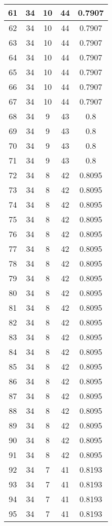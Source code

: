 \documentclass[letterpaper, 12pt]{article}
\begin{document}
\begin{longtable}{|c|c|c|c|c|}
\hline
61 & 34 & 10 & 44 & 0.7907 \\
\hline
62 & 34 & 10 & 44 & 0.7907 \\
\hline
63 & 34 & 10 & 44 & 0.7907 \\
\hline
64 & 34 & 10 & 44 & 0.7907 \\
\hline
65 & 34 & 10 & 44 & 0.7907 \\
\hline
66 & 34 & 10 & 44 & 0.7907 \\
\hline
67 & 34 & 10 & 44 & 0.7907 \\
\hline
68 & 34 & 9 & 43 & 0.8 \\
\hline
69 & 34 & 9 & 43 & 0.8 \\
\hline
70 & 34 & 9 & 43 & 0.8 \\
\hline
71 & 34 & 9 & 43 & 0.8 \\
\hline
72 & 34 & 8 & 42 & 0.8095 \\
\hline
73 & 34 & 8 & 42 & 0.8095 \\
\hline
74 & 34 & 8 & 42 & 0.8095 \\
\hline
75 & 34 & 8 & 42 & 0.8095 \\
\hline
76 & 34 & 8 & 42 & 0.8095 \\
\hline
77 & 34 & 8 & 42 & 0.8095 \\
\hline
78 & 34 & 8 & 42 & 0.8095 \\
\hline
79 & 34 & 8 & 42 & 0.8095 \\
\hline
80 & 34 & 8 & 42 & 0.8095 \\
\hline
81 & 34 & 8 & 42 & 0.8095 \\
\hline
82 & 34 & 8 & 42 & 0.8095 \\
\hline
83 & 34 & 8 & 42 & 0.8095 \\
\hline
84 & 34 & 8 & 42 & 0.8095 \\
\hline
85 & 34 & 8 & 42 & 0.8095 \\
\hline
86 & 34 & 8 & 42 & 0.8095 \\
\hline
87 & 34 & 8 & 42 & 0.8095 \\
\hline
88 & 34 & 8 & 42 & 0.8095 \\
\hline
89 & 34 & 8 & 42 & 0.8095 \\
\hline
90 & 34 & 8 & 42 & 0.8095 \\
\hline
91 & 34 & 8 & 42 & 0.8095 \\
\hline
92 & 34 & 7 & 41 & 0.8193 \\
\hline
93 & 34 & 7 & 41 & 0.8193 \\
\hline
94 & 34 & 7 & 41 & 0.8193 \\
\hline
95 & 34 & 7 & 41 & 0.8193 \\

\end{longtable}
\end{document}
